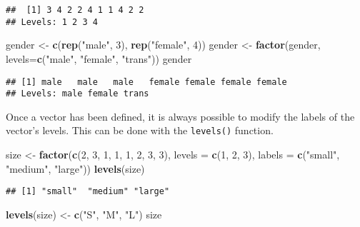 \documentclass[]{book}
\newenvironment{Shaded}{\begin{snugshade}}{\end{snugshade}}
\newcommand{\KeywordTok}[1]{\textcolor[rgb]{0.13,0.29,0.53}{\textbf{{#1}}}}
\newcommand{\DataTypeTok}[1]{\textcolor[rgb]{0.13,0.29,0.53}{{#1}}}
\newcommand{\DecValTok}[1]{\textcolor[rgb]{0.00,0.00,0.81}{{#1}}}
\newcommand{\StringTok}[1]{\textcolor[rgb]{0.31,0.60,0.02}{{#1}}}
\newcommand{\NormalTok}[1]{{#1}}
\begin{document}
\begin{verbatim}
##  [1] 3 4 2 2 4 1 1 4 2 2
## Levels: 1 2 3 4
\end{verbatim}

\begin{Shaded}
\begin{Highlighting}[]
\NormalTok{gender <-}\StringTok{ }\KeywordTok{c}\NormalTok{(}\KeywordTok{rep}\NormalTok{(}\StringTok{"male"}\NormalTok{, }\DecValTok{3}\NormalTok{), }\KeywordTok{rep}\NormalTok{(}\StringTok{"female"}\NormalTok{, }\DecValTok{4}\NormalTok{))}
\NormalTok{gender <-}\StringTok{ }\KeywordTok{factor}\NormalTok{(gender, }\DataTypeTok{levels=}\KeywordTok{c}\NormalTok{(}\StringTok{"male"}\NormalTok{, }\StringTok{"female"}\NormalTok{, }\StringTok{"trans"}\NormalTok{))}
\NormalTok{gender}
\end{Highlighting}
\end{Shaded}

\begin{verbatim}
## [1] male   male   male   female female female female
## Levels: male female trans
\end{verbatim}

Once a vector has been defined, it is always possible to modify the
labels of the vector's levels. This can be done with the
\texttt{levels()} function.

\begin{Shaded}
\begin{Highlighting}[]
\NormalTok{size <-}\StringTok{ }\KeywordTok{factor}\NormalTok{(}\KeywordTok{c}\NormalTok{(}\DecValTok{2}\NormalTok{, }\DecValTok{3}\NormalTok{, }\DecValTok{1}\NormalTok{, }\DecValTok{1}\NormalTok{, }\DecValTok{1}\NormalTok{, }\DecValTok{2}\NormalTok{, }\DecValTok{3}\NormalTok{, }\DecValTok{3}\NormalTok{), }\DataTypeTok{levels =} \KeywordTok{c}\NormalTok{(}\DecValTok{1}\NormalTok{, }\DecValTok{2}\NormalTok{, }\DecValTok{3}\NormalTok{),}
  \DataTypeTok{labels =} \KeywordTok{c}\NormalTok{(}\StringTok{"small"}\NormalTok{, }\StringTok{"medium"}\NormalTok{, }\StringTok{"large"}\NormalTok{))}
\KeywordTok{levels}\NormalTok{(size)}
\end{Highlighting}
\end{Shaded}

\begin{verbatim}
## [1] "small"  "medium" "large"
\end{verbatim}

\begin{Shaded}
\begin{Highlighting}[]
\KeywordTok{levels}\NormalTok{(size) <-}\StringTok{ }\KeywordTok{c}\NormalTok{(}\StringTok{"S"}\NormalTok{, }\StringTok{"M"}\NormalTok{, }\StringTok{"L"}\NormalTok{)}
\NormalTok{size}
\end{Highlighting}
\end{Shaded}
\end{document}
